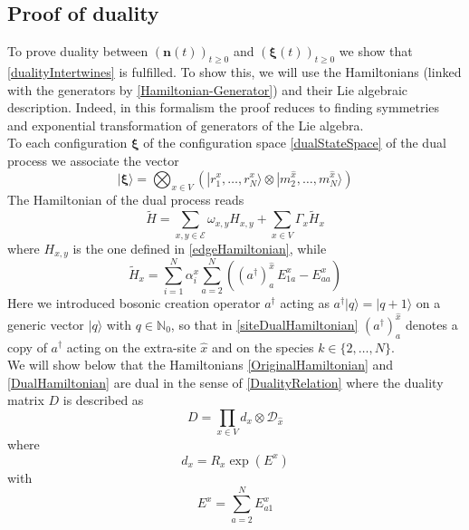\documentclass[11pt]{article}
\numberwithin{equation}{section}
\numberwithin{equation}{subsection}
\newcommand{\dd}{\mathcal{D}_{\widehat{x}}}
\begin{document}
\subsection{Proof of duality}
To prove duality between $(\bm{n}(t))_{t\geq 0}$ and $(\bm{\xi}(t))_{t\geq 0}$ we  show that \eqref{dualityIntertwines} is fulfilled.  To show this, we will use the Hamiltonians (linked with the generators by \eqref{Hamiltonian-Generator}) and their Lie algebraic description. Indeed, in this formalism the proof reduces to finding symmetries and exponential transformation of generators of the Lie algebra.\\
To each configuration $\bm{\xi}$ of the configuration space  \eqref{dualStateSpace} of the dual process we associate the vector
\begin{equation}
    |\bm{\xi}\rangle=\bigotimes_{x\in V}\left(|r_{1}^{x},\ldots,r_{N}^{x}\rangle\otimes |m_{2}^{\widehat{x}},\ldots,m_{N}^{\widehat{x}}\rangle\right)
\end{equation}
The Hamiltonian of the dual process reads
\begin{equation}\label{DualHamiltonian}
    \widetilde{H}=\sum_{x,y\in \mathcal{E}}\omega_{x,y}H_{x,y}+\sum_{x\in V}\Gamma_{x}\widetilde{H}_{x}
\end{equation}
where $H_{x,y}$ is the one defined in \eqref{edgeHamiltonian}, while 
\begin{equation}\label{siteDualHamiltonian}
    \widetilde{H}_{x}=\sum_{i=1}^{N}\alpha_{i}^{x}\sum_{a=2}^{N}\left((a^{\dagger})_{a}^{\widehat{x}}\,E_{1a}^{x}-E_{aa}^{x}\right)
\end{equation}
Here we introduced bosonic creation operator $a^{\dagger}$ acting as $a^{\dagger}|q\rangle=|q+1\rangle$ on a generic vector $|q\rangle$ with $q\in \mathbb{N}_{0}$, so that in \eqref{siteDualHamiltonian} 
$(a^{\dagger})_{a}^{\widehat{x}}$ denotes a copy of $a^{\dagger}$ acting on the extra-site $\widehat{x}$ and on the species $k\in\{2,\ldots,N\}$. \\
We will show below that the Hamiltonians \eqref{OriginalHamiltonian} and \eqref{DualHamiltonian} are dual in the sense of \eqref{DualityRelation} where the duality matrix $D$ is described as 
\begin{equation}\label{dualityMatrix}
    D=\prod_{x\in V}d_{x}\otimes \dd
\end{equation}
where
\begin{equation}
d_{x}=R_{x}\exp{(E^{x})}
\end{equation}
with 
\begin{equation}\label{EquationEx}
E^{x}=\sum_{a=2}^{N}E_{a1}^{x}
\end{equation}
\end{document}
